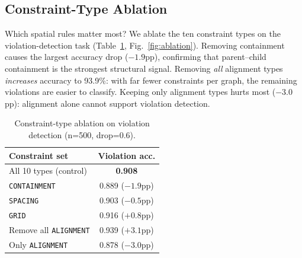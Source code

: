 \documentclass[11pt, letterpaper]{article}
\begin{document}
\subsection{Constraint-Type Ablation}
Which spatial rules matter most? We ablate the ten constraint types on the
violation-detection task (Table~\ref{tab:ablation}, Fig.~\ref{fig:ablation}).
Removing containment causes the largest accuracy drop ($-1.9$pp), confirming
that parent--child containment is the strongest structural signal. Removing
\emph{all} alignment types \emph{increases} accuracy to 93.9\%: with far
fewer constraints per graph, the remaining violations are easier to
classify. Keeping only alignment types hurts most ($-3.0$pp): alignment alone
cannot support violation detection.

\begin{table}[htbp]
\caption{Constraint-type ablation on violation detection (n=500, drop=0.6).}
\label{tab:ablation}
\centering
\begin{tabularx}{\textwidth}{Xc}
\toprule
\textbf{Constraint set} & \textbf{Violation acc.} \\
\midrule
All 10 types (control) & \textbf{0.908} \\
\texttt{CONTAINMENT} & 0.889 ($-1.9$pp) \\
\texttt{SPACING} & 0.903 ($-0.5$pp) \\
\texttt{GRID} & 0.916 ($+0.8$pp) \\
Remove all \texttt{ALIGNMENT} & 0.939 ($+3.1$pp) \\
Only \texttt{ALIGNMENT} & 0.878 ($-3.0$pp) \\
\bottomrule
\end{tabularx}
\end{table}
\end{document}
